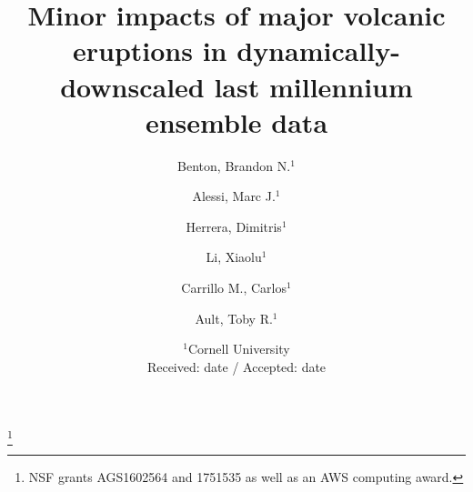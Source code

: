 \documentclass[smallextended]{svjour3}       %
\begin{document}
\title{Minor impacts of major volcanic eruptions in
  dynamically-downscaled last millennium ensemble data} %

\thanks{NSF grants AGS1602564 and 1751535 as well as an AWS computing award.} %

%




\author{Benton, Brandon N.$^1$ \and Alessi, Marc J.$^1$ \and Herrera, Dimitris$^1$ \and Li, Xiaolu$^1$ \and Carrillo M., Carlos$^1$ \and Ault, Toby R.$^1$}



\date{$^1$Cornell University \\
Received: date / Accepted: date}

\maketitle
\end{document}
